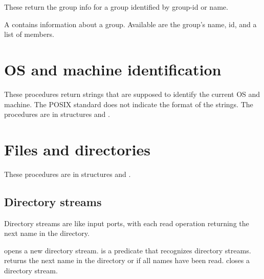 \begin{protos}
\end{protos}
\noindent
These return the group info for a group identified by group-id or name.

\begin{protos}
\end{protos}
\noindent
A  contains information about a group.
Available are the group's name, id, and a list of members.

\section{OS and machine identification}

These procedures return strings that are supposed to identify the current
 OS and machine.
The POSIX standard does not indicate the format of the strings.
The procedures are in structures  and .

\begin{protos}
\end{protos}


\section{Files and directories}

These procedures are in structures  and .

\subsection{Directory streams}

Directory streams are like input ports, with each read operation
 returning the next name in the directory.

\begin{protos}
\end{protos}
\noindent
{} opens a new directory stream.
 is a predicate that recognizes directory streams.
 returns the next name in the directory or
  if all names have been read.
 closes a directory stream.

